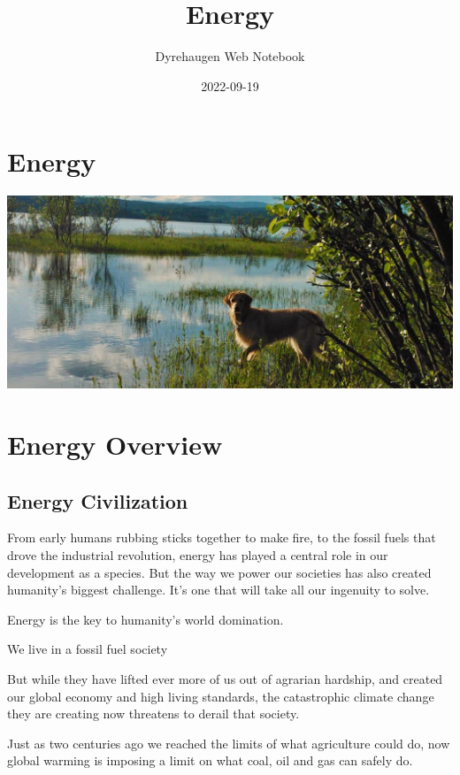 \documentclass[
]{book}
\title{Energy}
\author{Dyrehaugen Web Notebook}
\date{2022-09-19}
\begin{document}
\maketitle

{
\setcounter{tocdepth}{1}
\tableofcontents
}
\hypertarget{energy}{%
\chapter{Energy}\label{energy}}

\includegraphics{fig/zelda.jpg}

\hypertarget{energy-overview}{%
\chapter{Energy Overview}\label{energy-overview}}

\hypertarget{energy-civilization}{%
\section{Energy Civilization}\label{energy-civilization}}

From early humans rubbing sticks together to make fire, to the fossil fuels that drove the industrial revolution, energy has played a central role in our development as a species. But the way we power our societies has also created humanity's biggest challenge. It's one that will take all our ingenuity to solve.

Energy is the key to humanity's world domination.

We live in a fossil fuel society

But while they have lifted ever more of us out of agrarian hardship, and created our global economy and high living standards, the catastrophic climate change they are creating now threatens to derail that society.

Just as two centuries ago we reached the limits of what agriculture could do, now global warming is imposing a limit on what coal, oil and gas can safely do.
\end{document}
